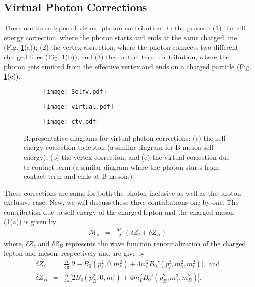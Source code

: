 \documentclass[a4paper,11pt]{article}
\begin{document}
	    	\subsection{Virtual Photon Corrections}
	    	\label{subsec2}
	    	There are three types of virtual photon contributions to the process: (1) the self energy correction, where the photon starts and ends at the same charged line (Fig. \ref{fig2v}(a)); (2) the vertex correction, where the photon connects two different charged lines (Fig. \ref{fig2v}(b)); and (3) the contact term contribution, where the photon gets emitted from the effective vertex and ends on a charged particle (Fig. \ref{fig2v}(c)).
	    	\begin{figure}[h]
	    	\begin{subfigure}{.32\textwidth}
	 		\centering
	 		\texttt{[image: Selfv.pdf]}
	 		\caption{}
	 	\end{subfigure}
	 	\begin{subfigure}{.32\textwidth}
	 		\centering
	 		\texttt{[image: virtual.pdf]}
	 		\caption{}
	 	\end{subfigure}
	    	\begin{subfigure}{.32\textwidth}
	 		\centering
	 		\texttt{[image: ctv.pdf]}
	 		\caption{}
	 	\end{subfigure}%
	 	\caption{Representative diagrams for virtual photon corrections: (a) the self energy correction to lepton (a similar diagram for B-meson self energy), (b) the vertex correction, and (c) the virtual correction due to contact term (a similar diagram where the photon starts from contact term and ends at B-meson.)}
	 	\label{fig2v}
	 	\end{figure}
	 	These corrections are same for both the photon inclusive as well as the photon exclusive case. Now, we will discuss these three contributions one by one. The contribution due to self energy of the charged lepton and the charged meson (\ref{fig2v}(a)) is given by
	    \begin{eqnarray}
	    	\mathcal{M}_{s}&=& \frac{\mathcal{M}_{0}}{2}(\delta Z_{\ell} + \delta Z_{B})
	    	\end{eqnarray}
	    	where, $\delta Z_{\ell}$ and $\delta Z_{B}$ represents the wave function renormalization of the charged lepton and meson, respectively and are give by
	    	\begin{eqnarray}
	    	\delta Z_{\ell}&=& \frac{\alpha}{4\pi}\Big[2-B_{0}(p_{\ell}^{2},0,m_{\ell}^{2})+4m_{\ell}^{2}B_{0}'(p_{\ell}^{2},m_{\gamma}^{2},m_{\ell}^{2})\Big] , \text{  and} \nonumber\\
	    	\delta Z_{B}&=& \frac{\alpha}{4\pi}\Big[2B_{0}(p_{B}^{2},0,m_{\ell}^{2})+4m_{B}^{2}B_{0}'(p_{B}^{2},m_{\gamma}^{2},m_{B}^{2})\Big].
	    	\end{eqnarray}
\end{document}
